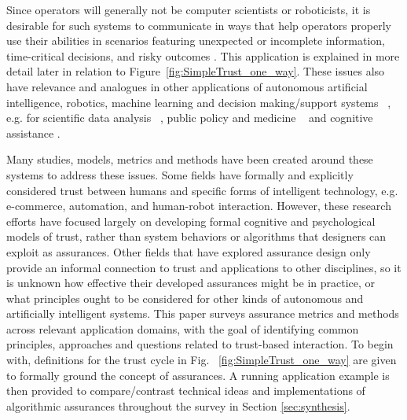     Since operators will generally not be computer scientists or roboticists, it is desirable for such systems to communicate in ways that help operators properly use their abilities in scenarios featuring unexpected or incomplete information, time-critical decisions, and risky outcomes \cite{Hutchins2015-if, Sweet2016-tz}. 
    This application is explained in more detail later in relation to Figure~\ref{fig:SimpleTrust_one_way}. 
    These issues also have relevance and analogues in other applications of autonomous artificial intelligence, robotics, machine learning and decision making/support systems ~\cite{Garcia2015-rs,Otte2013-oo,Sugiyama2013-ci,Amodei2016-xi}, e.g. for scientific data analysis ~\cite{Faghmous2014-og}, public policy and medicine ~\cite{Wagner2016-ck,Jovanovic2016-gw} and cognitive assistance \cite{Gutfreund2016-xe}.
    
    Many studies, models, metrics and methods have been created around these systems to address these issues. 
    Some fields have formally and explicitly considered trust between humans and specific forms of intelligent technology, e.g. e-commerce, automation, and human-robot interaction. However, these research efforts have focused largely on developing formal cognitive and psychological models of trust, rather than system behaviors or algorithms that designers can exploit as assurances. %
    Other fields that have explored assurance design only provide an informal connection to trust and applications to other disciplines, so it is unknown how effective their developed assurances might be in practice, or what principles ought to be considered for other kinds of autonomous and artificially intelligent systems. 
    This paper surveys assurance metrics and methods across relevant application domains, with the goal of %
    identifying common principles, approaches and questions related to trust-based interaction. %
    To begin with, definitions for the trust cycle in Fig. ~\ref{fig:SimpleTrust_one_way} are given to formally ground the concept of assurances. A running application example is then provided to compare/contrast technical ideas and implementations of algorithmic assurances throughout the survey in Section \ref{sec:synthesis}. 
     
